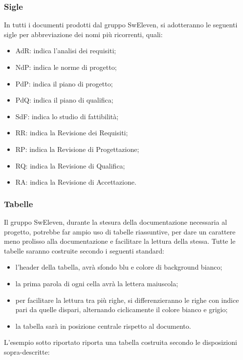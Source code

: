 \subsubsection{Sigle}
In tutti i documenti prodotti dal gruppo SwEleven, si adotteranno le seguenti sigle per abbreviazione dei nomi più ricorrenti, quali:
\begin{itemize}
	\item AdR: indica l’analisi dei requisiti;
	\item NdP: indica le norme di progetto;
	\item PdP: indica il piano di progetto;
	\item PdQ: indica il piano di qualifica;
	\item SdF: indica lo studio di fattibilità;
	\item RR: indica la Revisione dei Requisiti;
	\item RP: indica la Revisione di Progettazione;
	\item RQ: indica la Revisione di Qualifica;
	\item RA: indica la Revisione di Accettazione.
\end{itemize}

\subsubsection{Tabelle}
Il gruppo SwEleven, durante la stesura della documentazione necessaria al progetto, potrebbe far ampio uso di tabelle riassuntive, per dare un carattere meno prolisso alla documentazione e facilitare la lettura della stessa.
Tutte le tabelle saranno costruite secondo i seguenti standard:
\begin{itemize}
	\item l’header della tabella, avrà sfondo blu e colore di background bianco;
	\item la prima parola di ogni cella avrà la lettera maiuscola;
	\item per facilitare la lettura tra più righe, si differenzieranno le righe con indice pari da quelle dispari, alternando ciclicamente il colore bianco e grigio;
	\item la tabella sarà in posizione centrale rispetto al documento.
\end{itemize}

L’esempio sotto riportato riporta una tabella costruita secondo le disposizioni sopra-descritte:

